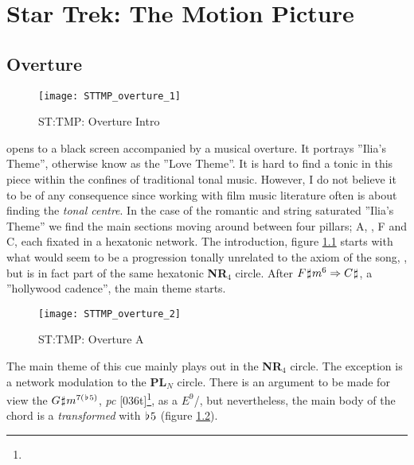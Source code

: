 
\chapter{Star Trek: The Motion Picture}\label{ch:sttmp}

\section{Overture}
\begin{figure}
\center
\texttt{[image: STTMP\_overture\_1]}
	\caption{ST:TMP: Overture Intro}
	\label{fg:sttmp_overture_1}
\end{figure}

\noindent{} opens to a black screen accompanied by a musical overture. It portrays ''Ilia's Theme'', otherwise know as the ''Love Theme''. It is hard to find a tonic in this piece within the confines of traditional tonal music. However, I do not believe it to be of any consequence since working with film music literature often is about finding the \textit{tonal centre}. In the case of the romantic and string saturated ''Ilia's Theme'' we find the main sections moving around between four pillars; A, \ciss, F and C, each fixated in a hexatonic network. The introduction, figure \ref{fg:sttmp_overture_1} starts with what would seem to be a progression tonally unrelated to the axiom of the song, \ciss, but is in fact part of the same hexatonic \textbf{NR\(_{4}\)} circle. After \(F\hspace*{0.18ex}\sharp\hspace*{0.18ex}{m}^{6}\Rightarrow{C\hspace*{0.18ex}\sharp\hspace*{0.18ex}}\), a ''hollywood cadence'', the main theme starts. 
\begin{figure}
\center
\texttt{[image: STTMP\_overture\_2]}
	\caption{ST:TMP: Overture A}
	\label{fg:sttmp_overture_2}
\end{figure}

The main theme of this cue mainly plays out in the \textbf{NR\(_{4}\)} circle. The exception is a network modulation to the \textbf{PL\(_{N}\)} circle. There is an argument to be made for view the \(G\hspace*{0.18ex}\sharp\hspace*{0.18ex}{m}^{7(\hspace*{0.18ex}\flat\hspace*{0.18ex}{5})}\), \textit{pc} [036t]\footnote{}, as a \(E^{9}\)/\giss, but nevertheless, the main body of the chord is a \gissm \textit{transformed} with \(\hspace*{0.18ex}\flat\hspace*{0.18ex}{5}\) (figure \ref{fg:sttmp_overture_2}).

